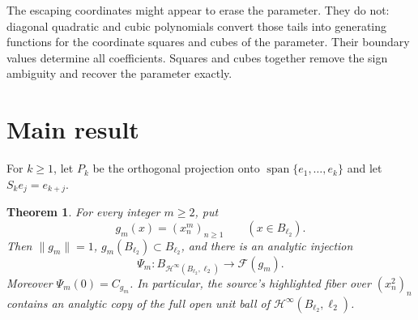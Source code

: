 \documentclass[11pt]{article}
\newtheorem{theorem}{Theorem}
\newcommand{\Hinf}{\mathcal H^\infty}
\newcommand{\B}{B_{\ell_2}}
\newcommand{\F}{\mathscr F}
\begin{document}
The escaping coordinates might appear to erase the parameter.  They do not:
diagonal quadratic and cubic polynomials convert those tails into generating
functions for the coordinate squares and cubes of the parameter.  Their
boundary values determine all coefficients.  Squares and cubes together
remove the sign ambiguity and recover the parameter exactly.

\section{Main result}

For $k\ge1$, let $P_k$ be the orthogonal projection onto
$\operatorname{span}\{e_1,\dots,e_k\}$ and let
$S_k e_j=e_{k+j}$.

\begin{theorem}\label{thm:main}
For every integer $m\ge2$, put
\[
 g_m(x)=(x_n^m)_{n\ge1}\qquad(x\in\B).
\]
Then $\|g_m\|=1$, $g_m(\B)\subset\B$, and there is an analytic injection
\[
 \Psi_m:B_{\Hinf(\B,\ell_2)}\longrightarrow \F(g_m).
\]
Moreover $\Psi_m(0)=C_{g_m}$.  In particular, the source's highlighted fiber
over $(x_n^2)_n$ contains an analytic copy of the full open unit ball of
$\Hinf(\B,\ell_2)$.
\end{theorem}
\end{document}
